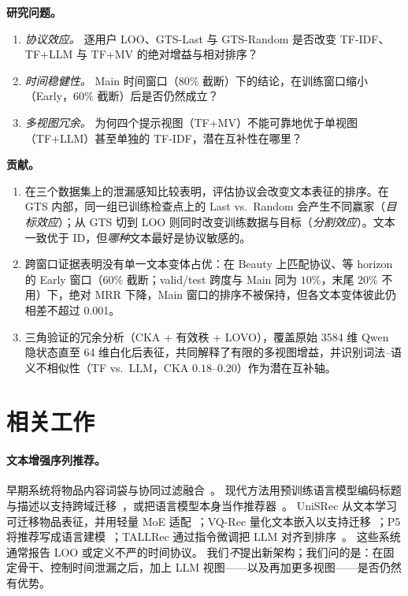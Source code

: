 \documentclass[sigconf,natbib=true,anonymous]{acmart}
\newcommand{\tfidf}{\textsc{TF-IDF}\xspace}
\newcommand{\tfllm}{\textsc{TF+LLM}\xspace}
\newcommand{\tfmv}{\textsc{TF+MV}\xspace}
\begin{document}
\medskip
\noindent\textbf{研究问题。}
\nopagebreak
\begin{enumerate}[leftmargin=*,itemsep=1pt,topsep=4pt]
\item[\textbf{RQ1}] \emph{协议效应。}
逐用户 LOO、GTS-Last 与 GTS-Random 是否改变 \tfidf、\tfllm 与 \tfmv 的绝对增益与相对排序？
\item[\textbf{RQ2}] \emph{时间稳健性。}
Main 时间窗口（$80\%$ 截断）下的结论，在训练窗口缩小（Early，$60\%$ 截断）后是否仍然成立？
\item[\textbf{RQ3}] \emph{多视图冗余。}
为何四个提示视图（\tfmv）不能可靠地优于单视图（\tfllm）甚至单独的 \tfidf，潜在互补性在哪里？
\end{enumerate}

\medskip
\noindent\textbf{贡献。}
\nopagebreak
\begin{enumerate}[leftmargin=*,itemsep=1pt,topsep=4pt]
\item 在三个数据集上的泄漏感知比较表明，评估协议会改变文本表征的排序。在 GTS 内部，同一组已训练检查点上的 Last vs.\ Random 会产生不同赢家（\emph{目标效应}）；从 GTS 切到 LOO 则同时改变训练数据与目标（\emph{分割效应}）。文本一致优于 ID，但\emph{哪种}文本最好是协议敏感的。
\item 跨窗口证据表明没有单一文本变体占优：在 Beauty 上匹配协议、等 horizon 的 Early 窗口（$60\%$ 截断；valid/\hspace{0pt}test 跨度与 Main 同为 $10\%$，末尾 $20\%$ 不用）下，绝对 MRR 下降，Main 窗口的排序不被保持，但各文本变体彼此仍相差不超过 0.001。
\item 三角验证的冗余分析（CKA + 有效秩 + LOVO），覆盖原始 3584 维 Qwen 隐状态直至 64 维白化后表征，共同解释了有限的多视图增益，并识别词法--语义不相似性（TF vs.\ LLM，CKA $0.18$--$0.20$）作为潜在互补轴。
\end{enumerate}

\section{相关工作}
\label{sec:related}

\paragraph{文本增强序列推荐。}
早期系统将物品内容词袋与协同过滤融合~\cite{wang2015cdl}。
现代方法用预训练语言模型编码标题与描述以支持跨域迁移~\cite{hou2022unisrec,hou2023vqrec}，或把语言模型本身当作推荐器~\cite{geng2022p5,bao2023tallrec}。
UniSRec 从文本学习可迁移物品表征，并用轻量 MoE 适配~\cite{hou2022unisrec}；VQ-Rec 量化文本嵌入以支持迁移~\cite{hou2023vqrec}；P5 将推荐写成语言建模~\cite{geng2022p5}；TALLRec 通过指令微调把 LLM 对齐到排序~\cite{bao2023tallrec}。
这些系统通常报告 LOO 或定义不严的时间协议。
我们\emph{不}提出新架构；我们问的是：在固定骨干、控制时间泄漏之后，加上 LLM 视图——以及再加更多视图——是否仍然有优势。
\end{document}
